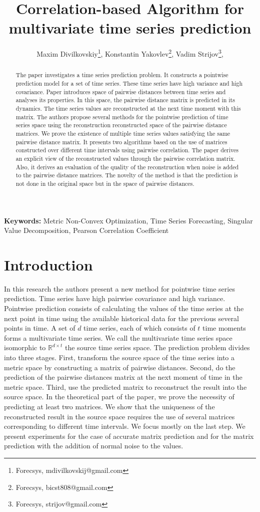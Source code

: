 \documentclass[12pt]{article}
\title{Correlation-based Algorithm for multivariate time series prediction}
\author{%
	Maxim Divilkovskiy\footnote{Forecsys, mdivilkovskij@gmail.com},  %
	Konstantin Yakovlev\footnote{Forecsys,  bicst808@gmail.com},  %
	Vadim Strijov\footnote{Forecsys,  strijov@gmail.com},  %
}
\begin{document}
\maketitle

\begin{abstract}
The paper investigates a time series prediction problem. It constructs a pointwise prediction model for a set of time series. These time series have high variance and high covariance. Paper introduces space of pairwise distances between time series and analyses its properties. In this space, the pairwise distance matrix is predicted in its dynamics. The time series values are reconstructed at the next time moment with this matrix. The authors propose several methods for the pointwise prediction of time series space using the reconstruction reconstructed space of the pairwise distance matrices. We prove the existence of multiple time series values satisfying the same pairwise distance matrix. It presents two algorithms based on the use of matrices constructed over different time intervals using pairwise correlation. The paper derives an explicit view of the reconstructed values through the pairwise correlation matrix. Also, it derives an evaluation of the quality of the reconstruction when noise is added to the pairwise distance matrices. The novelty of the method is that the prediction is not done in the original space but in the space of pairwise distances.


\end{abstract}

\textbf{Keywords:} Metric Non-Convex Optimization, Time Series Forecasting, Singular Value Decomposition, Pearson Correlation Coefficient

\section{Introduction}
 	In this research the authors present a new method for pointwise time series prediction. Time series have high pairwise covariance and high variance. Pointwise prediction consists of calculating the values of the time series at the next point in time using the available historical data for the previous several points in time. A set of $d$ time series, each of which consists of $t$ time moments forms a multivariate time series. We call the multivariate time series space isomorphic to $\mathbb{R}^{d \times t}$ the source time series space. The prediction problem divides into three stages. First, transform the source space of the time series into a metric space by constructing a matrix of pairwise distances. Second, do the prediction of the pairwise distances matrix at the next moment of time in the metric space. Third, use the predicted matrix to reconstruct the result into the source space. In the theoretical part of the paper, we prove the necessity of predicting at least two matrices. We show that the uniqueness of the reconstructed result in the source space requires the use of several matrices corresponding to different time intervals. We focus mostly on the last step. We present experiments for the case of accurate matrix prediction and for the matrix prediction with the addition of normal noise to the values.
\end{document}

